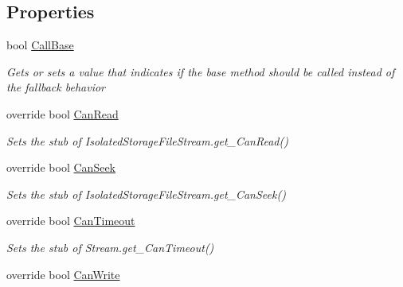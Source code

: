 \subsection*{Properties}
\begin{DoxyCompactItemize}
\item 
bool \hyperlink{class_system_1_1_i_o_1_1_isolated_storage_1_1_fakes_1_1_stub_isolated_storage_file_stream_af2570e5bbda490b4505fa2e50209bf63}{Call\-Base}
\begin{DoxyCompactList}\small\item\em Gets or sets a value that indicates if the base method should be called instead of the fallback behavior\end{DoxyCompactList}\item 
override bool \hyperlink{class_system_1_1_i_o_1_1_isolated_storage_1_1_fakes_1_1_stub_isolated_storage_file_stream_af4238c174a235c6e9c212139f15c0eb6}{Can\-Read}
\begin{DoxyCompactList}\small\item\em Sets the stub of Isolated\-Storage\-File\-Stream.\-get\-\_\-\-Can\-Read()\end{DoxyCompactList}\item 
override bool \hyperlink{class_system_1_1_i_o_1_1_isolated_storage_1_1_fakes_1_1_stub_isolated_storage_file_stream_a0966ff5c892ee23cee0a1a70f33ff932}{Can\-Seek}
\begin{DoxyCompactList}\small\item\em Sets the stub of Isolated\-Storage\-File\-Stream.\-get\-\_\-\-Can\-Seek()\end{DoxyCompactList}\item 
override bool \hyperlink{class_system_1_1_i_o_1_1_isolated_storage_1_1_fakes_1_1_stub_isolated_storage_file_stream_a887637f0e66903ce6039a4a2ddd0b594}{Can\-Timeout}
\begin{DoxyCompactList}\small\item\em Sets the stub of Stream.\-get\-\_\-\-Can\-Timeout()\end{DoxyCompactList}\item 
override bool \hyperlink{class_system_1_1_i_o_1_1_isolated_storage_1_1_fakes_1_1_stub_isolated_storage_file_stream_ae43fc81b1c53eef66952172e9e8ffcd5}{Can\-Write}

\end{DoxyCompactItemize}
